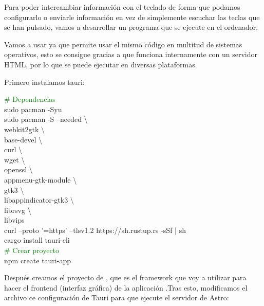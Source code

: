 Para poder intercambiar información con el teclado de forma que podamos configurarlo o enviarle información en vez de simplemente escuchar las teclas que se han pulsado, vamos a desarrollar un programa que se ejecute en el ordenador. 

Vamos a usar  ya que permite usar el mismo código en multitud de sistemas operativos, esto se consigue gracias a que funciona internamente con un servidor HTML, por lo que se puede ejecutar en diversas plataformas.

Primero instalamos tauri:
\begin{multicli}
    \textcolor{green}{\# Dependencias} \\
    \cliarrow sudo pacman -Syu \\
    \cliarrow sudo pacman -S --needed \textbackslash \\
    \mytab webkit2gtk \textbackslash \\
    \mytab base-devel \textbackslash \\
    \mytab curl \textbackslash \\
    \mytab wget \textbackslash \\
    \mytab openssl \textbackslash \\
    \mytab appmenu-gtk-module  \textbackslash \\
    \mytab gtk3 \textbackslash \\
    \mytab libappindicator-gtk3 \textbackslash \\
    \mytab librsvg \textbackslash \\
    \mytab libvips \\
    \cliarrow curl --proto '=https' --tlsv1.2 https://sh.rustup.rs -sSf | sh \\
    \cliarrow cargo install tauri-cli \\

    \textcolor{green}{\# Crear proyecto} \\
    \cliarrow npm create tauri-app
\end{multicli}

Después creamos el proyecto de , que es el framework que voy a utilizar para hacer el frontend (interfaz gráfica) de la aplicación .Tras esto, modificamos el archivo ce configuración de Tauri para que ejecute el servidor de Astro: \vspace{1cm} \newline
{}

